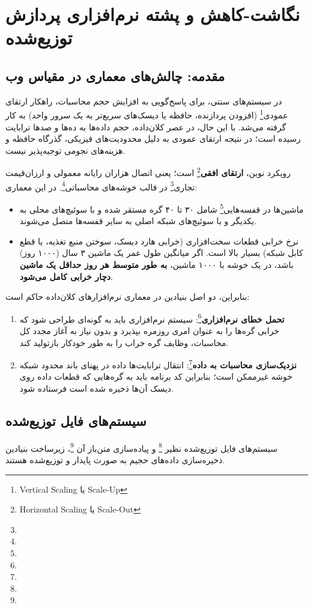 \chapter{نگاشت-کاهش و پشته نرم‌افزاری پردازش توزیع‌شده}
\label{ch:mapreduce}

\section{مقدمه: چالش‌های معماری در مقیاس وب}
در سیستم‌های سنتی، برای پاسخ‌گویی به افزایش حجم محاسبات، راهکار ارتقای عمودی\footnote{Vertical Scaling یا Scale-Up} (افزودن پردازنده، حافظه یا دیسک‌های سریع‌تر به یک سرور واحد) به کار گرفته می‌شد. با این حال، در عصر کلان‌داده، حجم داده‌ها به ده‌ها و صدها ترابایت رسیده است؛ در نتیجه ارتقای عمودی به دلیل محدودیت‌های فیزیکی، گذرگاه حافظه و هزینه‌های نجومی توجیه‌پذیر نیست.

رویکرد نوین، \textbf{ارتقای افقی}\footnote{Horizontal Scaling یا Scale-Out} است؛ یعنی اتصال هزاران رایانه معمولی و ارزان‌قیمت تجاری\footnote{} در قالب خوشه‌های محاسباتی\footnote{}. در این معماری:
\begin{itemize}
    \item ماشین‌ها در قفسه‌هایی\footnote{} شامل ۳۰ تا ۴۰ گره مستقر شده و با سوئیچ‌های محلی به یکدیگر و با سوئیچ‌های شبکه اصلی به سایر قفسه‌ها متصل می‌شوند.
    \item نرخ خرابی قطعات سخت‌افزاری (خرابی هارد دیسک، سوختن منبع تغذیه، یا قطع کابل شبکه) بسیار بالا است. اگر میانگین طول عمر یک ماشین ۳ سال (۱۰۰۰ روز) باشد، در یک خوشه با ۱۰۰۰ ماشین، \textbf{به طور متوسط هر روز حداقل یک ماشین دچار خرابی کامل می‌شود}.
\end{itemize}

بنابراین، دو اصل بنیادین در معماری نرم‌افزارهای کلان‌داده حاکم است:
\begin{enumerate}
    \item \textbf{تحمل خطای نرم‌افزاری}\footnote{}: سیستم نرم‌افزاری باید به گونه‌ای طراحی شود که خرابی گره‌ها را به عنوان امری روزمره بپذیرد و بدون نیاز به آغاز مجدد کل محاسبات، وظایف گره خراب را به طور خودکار بازتولید کند.
    \item \textbf{نزدیک‌سازی محاسبات به داده}\footnote{}: انتقال ترابایت‌ها داده در پهنای باند محدود شبکه خوشه غیرممکن است؛ بنابراین کد برنامه باید به گره‌هایی که قطعات داده روی دیسک آن‌ها ذخیره شده است فرستاده شود.
\end{enumerate}

\section{سیستم‌های فایل توزیع‌شده \texorpdfstring{}{(DFS / GFS / HDFS)}}
سیستم‌های فایل توزیع‌شده نظیر \footnote{} و پیاده‌سازی متن‌باز آن \footnote{}، زیرساخت بنیادین ذخیره‌سازی داده‌های حجیم به صورت پایدار و توزیع‌شده هستند.

